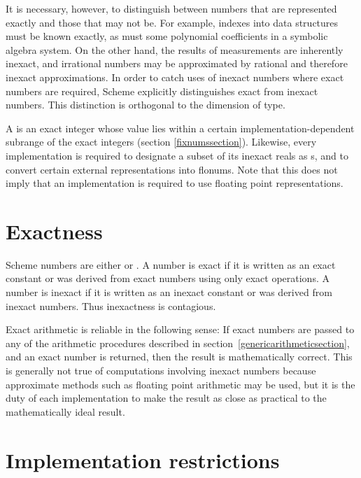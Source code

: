 It is necessary, however, to distinguish between numbers that are
represented exactly and those that may not be.  For example, indexes
into data structures must be known exactly, as must some polynomial
coefficients in a symbolic algebra system.  On the other hand, the
results of measurements are inherently inexact, and irrational numbers
may be approximated by rational and therefore inexact approximations.
In order to catch uses of inexact numbers where exact numbers are
required, Scheme explicitly distinguishes exact from inexact numbers.
This distinction is orthogonal to the dimension of type.

A  is an exact integer whose value lies
within a certain implementation-dependent subrange of the
exact integers (section \ref{fixnumssection}).
Likewise, every implementation is required
to designate a subset of its inexact reals as s, and
to convert certain external representations into flonums.  Note that
this does not imply that an implementation is required to use
floating point representations.

\section{Exactness}
\label{exactly}

 Scheme numbers are either  or
.  A number is exact if it is written as an exact
constant or was derived from exact numbers using only exact
operations.  A number is inexact if it is written as an inexact
constant or was derived from inexact numbers.  Thus inexactness is
contagious.  

Exact arithmetic is reliable in the following sense:
If exact numbers are passed to any of the arithmetic procedures
described in section~\ref{genericarithmeticsection}, and an
exact number is returned, then the result is mathematically
correct.
This is generally not true of
computations involving inexact numbers because approximate methods
such as floating point arithmetic may be used, but it is the duty of
each implementation to make the result as close as practical to the
mathematically ideal result.

\section{Implementation restrictions}

\label{restrictions}

